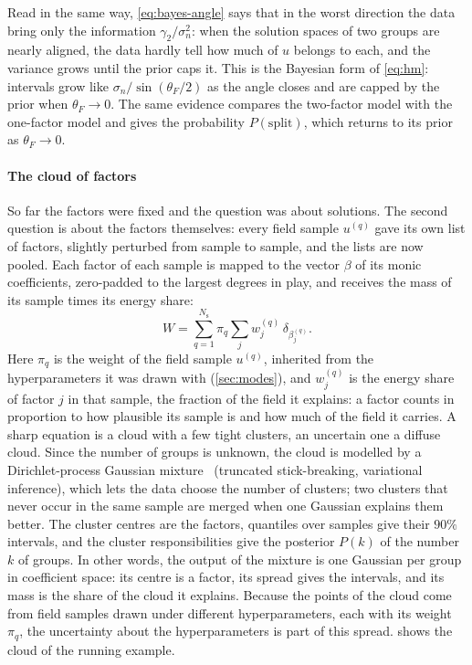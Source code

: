 \documentclass[11pt]{article}
\theoremstyle{plain}
\theoremstyle{definition}
\theoremstyle{remark}
\newcommand{\thetaF}{\theta_{F}}            %
\newcommand{\noise}{\sigma_{n}}             %
\newcommand{\Nsamp}{N_{\mathrm s}}          %
\newcommand{\cloud}{W}                      %
\begin{document}
Read in the same way, \eqref{eq:bayes-angle} says that in the worst direction the data bring only the information
$\gamma_2/\noise^2$: when the solution spaces of two groups are nearly aligned, the data hardly tell how much of $u$
belongs to each, and the variance grows until the prior caps it. This is the Bayesian form of \eqref{eq:hm}: intervals grow like $\noise/\sin(\thetaF/2)$ as the angle closes and are capped
by the prior when $\thetaF\to0$. The same evidence compares the two-factor model with the one-factor model and gives the
probability $P(\text{split})$, which returns to its prior as $\thetaF\to0$.

\paragraph{The cloud of factors} So far the factors were fixed and the question was about solutions. The second question is
about the factors themselves: every field sample $u^{(q)}$ gave its own list of factors, slightly perturbed from sample to
sample, and the lists are now pooled. Each factor of each sample is mapped to the vector $\beta$ of its monic coefficients,
zero-padded to the largest degrees in play, and receives the mass of its sample times its energy share:
\begin{equation}\label{eq:cloud}
  \cloud=\sum_{q=1}^{\Nsamp}\pi_q\sum_jw_j^{(q)}\,\delta_{\beta_j^{(q)}} .
\end{equation}
Here $\pi_q$ is the weight of the field sample $u^{(q)}$, inherited from the hyperparameters it was drawn with
(\cref{sec:modes}), and $w_j^{(q)}$ is the energy share of factor $j$ in that sample, the fraction of the field it
explains: a factor counts in proportion to how plausible its sample is and how much of the field it carries. A sharp equation is a cloud with a few tight clusters, an uncertain one a diffuse cloud. Since the number of groups is
unknown, the cloud is modelled by a Dirichlet-process Gaussian mixture~\cite{BleJor06} (truncated stick-breaking,
variational inference), which lets the data choose the number of clusters; two clusters that never occur in the same
sample are merged when one Gaussian explains them better. The cluster centres are the factors, quantiles over samples
give their $90\%$ intervals, and the cluster responsibilities give the posterior $P(k)$ of the number $k$ of groups. In other words, the output of the mixture is one Gaussian per group in coefficient space: its centre is a factor,
its spread gives the intervals, and its mass is the share of the cloud it explains. Because the points of the cloud
come from field samples drawn under different hyperparameters, each with its weight $\pi_q$, the uncertainty about the
hyperparameters is part of this spread.
 shows the cloud of the running example.
\end{document}
